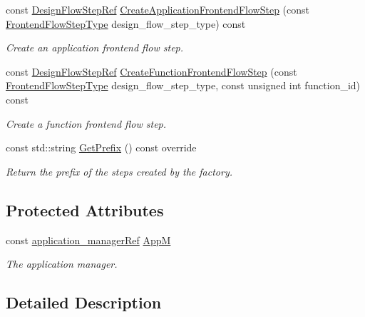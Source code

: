 \begin{DoxyCompactItemize}
const \hyperlink{design__flow__step_8hpp_a9dd6b4474ddf52d41a78b1aaa12ae6c8}{Design\+Flow\+Step\+Ref} \hyperlink{classFrontendFlowStepFactory_acb4687f1adae9d742883ba490af45993}{Create\+Application\+Frontend\+Flow\+Step} (const \hyperlink{frontend__flow__step_8hpp_afeb3716c693d2b2e4ed3e6d04c3b63bb}{Frontend\+Flow\+Step\+Type} design\+\_\+flow\+\_\+step\+\_\+type) const
\begin{DoxyCompactList}\small\item\em Create an application frontend flow step. \end{DoxyCompactList}\item 
const \hyperlink{design__flow__step_8hpp_a9dd6b4474ddf52d41a78b1aaa12ae6c8}{Design\+Flow\+Step\+Ref} \hyperlink{classFrontendFlowStepFactory_a16fcc4098999af461632f4af3404e6fc}{Create\+Function\+Frontend\+Flow\+Step} (const \hyperlink{frontend__flow__step_8hpp_afeb3716c693d2b2e4ed3e6d04c3b63bb}{Frontend\+Flow\+Step\+Type} design\+\_\+flow\+\_\+step\+\_\+type, const unsigned int function\+\_\+id) const
\begin{DoxyCompactList}\small\item\em Create a function frontend flow step. \end{DoxyCompactList}\item 
const std\+::string \hyperlink{classFrontendFlowStepFactory_af3ccb203f94d1774361a9095694ab11f}{Get\+Prefix} () const override
\begin{DoxyCompactList}\small\item\em Return the prefix of the steps created by the factory. \end{DoxyCompactList}\end{DoxyCompactItemize}
\subsection*{Protected Attributes}
\begin{DoxyCompactItemize}
\item 
const \hyperlink{application__manager_8hpp_a04ccad4e5ee401e8934306672082c180}{application\+\_\+manager\+Ref} \hyperlink{classFrontendFlowStepFactory_ae382b19905edb984bb595f22dca874d3}{AppM}
\begin{DoxyCompactList}\small\item\em The application manager. \end{DoxyCompactList}\end{DoxyCompactItemize}


\subsection{Detailed Description}


